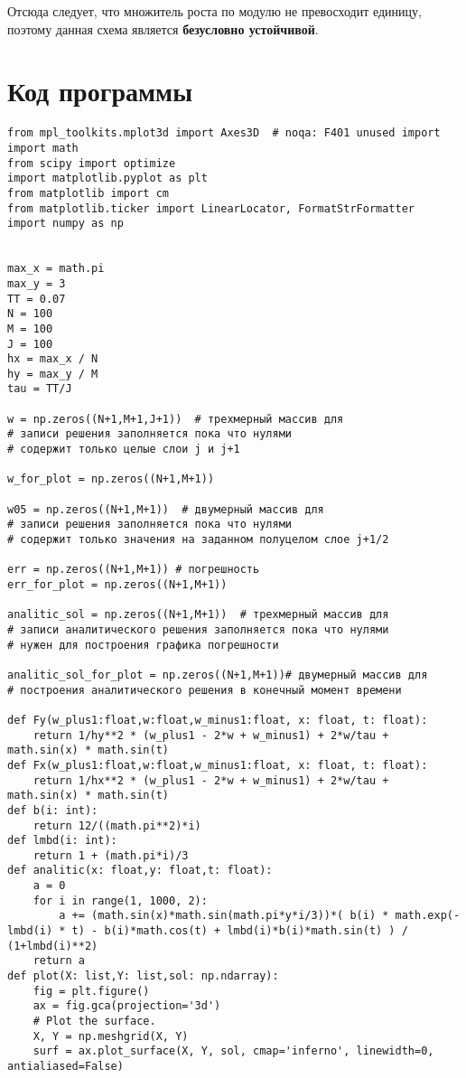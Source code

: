 \documentclass{article}
\begin{document}
Отсюда следует, что множитель роста по модулю не превосходит единицу, поэтому данная схема является \textbf{безусловно устойчивой}.
\newpage
\section{Код программы}
\begin{verbatim}
from mpl_toolkits.mplot3d import Axes3D  # noqa: F401 unused import
import math
from scipy import optimize
import matplotlib.pyplot as plt
from matplotlib import cm
from matplotlib.ticker import LinearLocator, FormatStrFormatter
import numpy as np


max_x = math.pi
max_y = 3
TT = 0.07
N = 100
M = 100
J = 100
hx = max_x / N
hy = max_y / M
tau = TT/J

w = np.zeros((N+1,M+1,J+1))  # трехмерный массив для
# записи решения заполняется пока что нулями
# содержит только целые слои j и j+1

w_for_plot = np.zeros((N+1,M+1))

w05 = np.zeros((N+1,M+1))  # двумерный массив для
# записи решения заполняется пока что нулями
# содержит только значения на заданном полуцелом слое j+1/2

err = np.zeros((N+1,M+1)) # погрешность
err_for_plot = np.zeros((N+1,M+1))

analitic_sol = np.zeros((N+1,M+1))  # трехмерный массив для
# записи аналитического решения заполняется пока что нулями
# нужен для построения графика погрешности

analitic_sol_for_plot = np.zeros((N+1,M+1))# двумерный массив для
# построения аналитического решения в конечный момент времени

def Fy(w_plus1:float,w:float,w_minus1:float, x: float, t: float):
    return 1/hy**2 * (w_plus1 - 2*w + w_minus1) + 2*w/tau + math.sin(x) * math.sin(t)
def Fx(w_plus1:float,w:float,w_minus1:float, x: float, t: float):
    return 1/hx**2 * (w_plus1 - 2*w + w_minus1) + 2*w/tau + math.sin(x) * math.sin(t)
def b(i: int):
    return 12/((math.pi**2)*i)
def lmbd(i: int):
    return 1 + (math.pi*i)/3
def analitic(x: float,y: float,t: float):
    a = 0
    for i in range(1, 1000, 2):
        a += (math.sin(x)*math.sin(math.pi*y*i/3))*( b(i) * math.exp(-lmbd(i) * t) - b(i)*math.cos(t) + lmbd(i)*b(i)*math.sin(t) ) / (1+lmbd(i)**2)
    return a
def plot(X: list,Y: list,sol: np.ndarray):
    fig = plt.figure()
    ax = fig.gca(projection='3d')
    # Plot the surface.
    X, Y = np.meshgrid(X, Y)
    surf = ax.plot_surface(X, Y, sol, cmap='inferno', linewidth=0, antialiased=False)


\end{verbatim}
\end{document}
